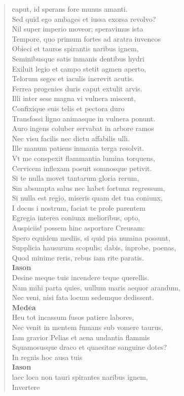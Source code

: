 \documentclass[11pt, a4paper]{report}
\begin{document}
\begin{verse}
{caput, id sperans fore munus amanti. \\ Sed quid ego ambages et iussa exorsa revolvo? \\ Nil super imperio moveor; speravimus ista \\ Tempore, quo primum fortes ad aratra iuvencos \\ Obieci et tauros spirantis naribus ignem, \\ Seminibusque satis inmanis dentibus hydri \\ Exiluit legio et campo stetit agmen aperto, \\ Telorum seges et iaculis increvit acutis. \\ Ferrea progenies duris caput extulit arvis. \\ Illi inter sese magna vi vulnera miscent, \\ Confixique suis telis et pectora duro \\ Transfossi ligno animasque in vulnera ponunt. \\ Auro ingens coluber servabat in arbore ramos \\ Nec visu facilis nec dictu affabilis ulli. \\ Ille manum patiens inmania terga resolvit. \\ Vt me conspexit flammantia lumina torquens, \\ Cervicem inflexam posuit somnosque petivit. \\ Si te nulla movet tantarum gloria rerum, \\ Sin absumpta salus nec habet fortuna regressum, \\ Si nulla est regio, miseris quam det tua coniunx, \\ I decus i nostrum, faciat te prole parentem \\ Egregia interea coniunx melioribus, opto, \\ Auspiciis!  \lbrack  possem  \rbrack  hinc asportare Creusam: \\ Spero equidem mediis, si quid pia numina possunt, \\ Supplicia hausurum scopulis; dabis, inprobe, poenas, \\ Quod minime reris, rebus iam rite paratis. \\ \textbf{Iason} \\Desine meque tuis incendere teque querellis. \\ Nam mihi parta quies, uullum maris aequor arandum, \\ Nec veni, nisi fata locum sedemque dedissent. \\ \textbf{Medea} \\Heu tot incassum fusos patiere labores, \\ Nec venit in mentem fumans sub vomere taurus, \\ Iam gravior Pelias et aena undantia flammis \\ Squamosusque draco et quaesitae sanguine dotes? \\ In regnis hoc ausa tuis \\ \textbf{Iason} \\laec loca non tauri spirantes naribus ignem, \\  \lbrack Invertere }
\end{verse}
\end{document}
